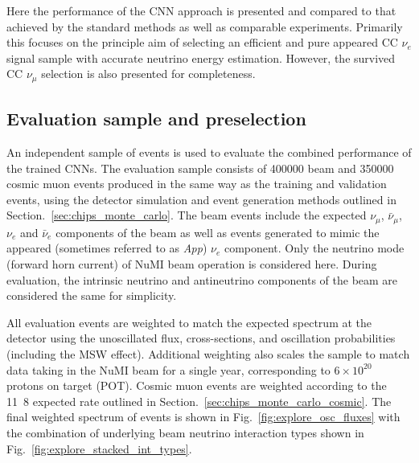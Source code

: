 Here the performance of the CNN approach is presented and compared to that achieved by the
standard \chips methods as well as comparable experiments. Primarily this focuses on the principle
aim of selecting an efficient and pure appeared CC $\nu_{e}$ signal sample with accurate neutrino
energy estimation. However, the survived CC $\nu_{\mu}$ selection is also presented for
completeness.

\subsection{Evaluation sample and preselection} %
\label{sec:results_eval_sample} %

An independent sample of events is used to evaluate the combined performance of the trained CNNs.
The evaluation sample consists of 400000 beam and 350000 cosmic muon events produced in the same
way as the training and validation events, using the detector simulation and event generation
methods outlined in Section.~\ref{sec:chips_monte_carlo}. The beam events include the expected
$\nu_{\mu}$, $\bar{\nu}_{\mu}$, $\nu_{e}$ and $\bar{\nu}_{e}$ components of the beam as well as
events generated to mimic the appeared (sometimes referred to as \emph{App}) $\nu_{e}$ component.
Only the neutrino mode (forward horn current) of NuMI beam operation is considered here. During
evaluation, the intrinsic neutrino and antineutrino components of the beam are considered the same
for simplicity.

All evaluation events are weighted to match the expected spectrum at the \chipsfive detector using
the unoscillated flux, cross-sections, and oscillation probabilities (including the MSW effect).
Additional weighting also scales the sample to match data taking in the NuMI beam for a single
year, corresponding to $6\times 10^{20}$ protons on target (POT). Cosmic muon events are weighted
according to the \unit{11.8}{} expected \chipsfive rate outlined in
Section.~\ref{sec:chips_monte_carlo_cosmic}. The final weighted spectrum of events is shown in
Fig.~\ref{fig:explore_osc_fluxes} with the combination of underlying beam neutrino interaction
types shown in Fig.~\ref{fig:explore_stacked_int_types}.

